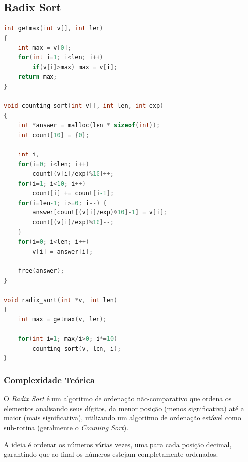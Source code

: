 \subsection{Radix Sort}
\begin{lstlisting}[language=C, caption={Implementação do Radix Sort}, label={lst:radix}]
int getmax(int v[], int len)
{
    int max = v[0];
    for(int i=1; i<len; i++)
        if(v[i]>max) max = v[i];
    return max;
}

void counting_sort(int v[], int len, int exp)
{
    int *answer = malloc(len * sizeof(int));
    int count[10] = {0};

    int i;
    for(i=0; i<len; i++)
        count[(v[i]/exp)%10]++;
    for(i=1; i<10; i++)
        count[i] += count[i-1];
    for(i=len-1; i>=0; i--) {
        answer[count[(v[i]/exp)%10]-1] = v[i];
        count[(v[i]/exp)%10]--;
    }
    for(i=0; i<len; i++)
        v[i] = answer[i];

    free(answer);
}

void radix_sort(int *v, int len)
{
    int max = getmax(v, len);

    for(int i=1; max/i>0; i*=10)
        counting_sort(v, len, i);
}
\end{lstlisting}

\subsubsection{Complexidade Teórica}

O \textit{Radix Sort} é um algoritmo de ordenação não-comparativo que ordena os elementos analisando seus dígitos, da menor posição (menos significativa) até a maior (mais significativa), utilizando um algoritmo de ordenação estável como sub-rotina (geralmente o \textit{Counting Sort}).

A ideia é ordenar os números várias vezes, uma para cada posição decimal, garantindo que ao final os números estejam
completamente ordenados.~\cite{geeksforgeeks_radix_sort}

